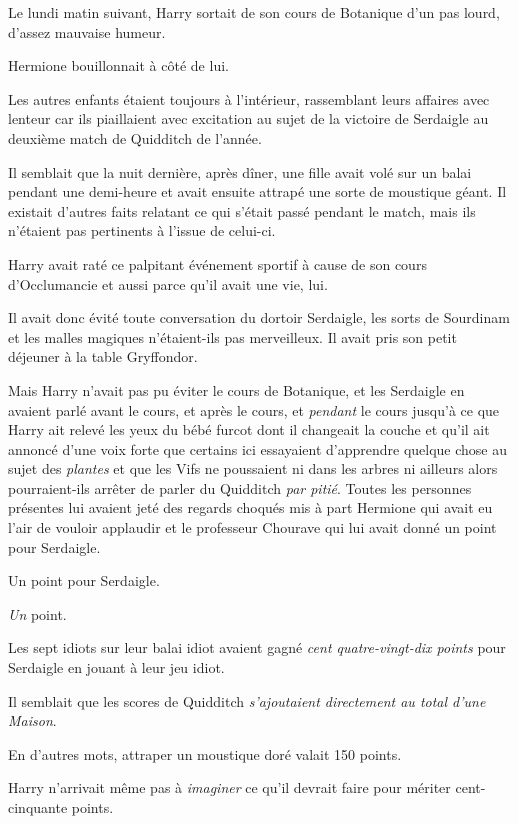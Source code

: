 \later

Le lundi matin suivant, Harry sortait de son cours de Botanique d'un pas lourd, d'assez mauvaise humeur.

Hermione bouillonnait à côté de lui.

Les autres enfants étaient toujours à l'intérieur, rassemblant leurs affaires avec lenteur car ils piaillaient avec excitation au sujet de la victoire de Serdaigle au deuxième match de Quidditch de l'année.

Il semblait que la nuit dernière, après dîner, une fille avait volé sur un balai pendant une demi-heure et avait ensuite attrapé une sorte de moustique géant.
Il existait d'autres faits relatant ce qui s'était passé pendant le match, mais ils n'étaient pas pertinents à l'issue de celui-ci.

Harry avait raté ce palpitant événement sportif à cause de son cours d'Occlumancie et aussi parce qu'il avait une vie, lui.

Il avait donc évité toute conversation du dortoir Serdaigle, les sorts de Sourdinam et les malles magiques n'étaient-ils pas merveilleux.
Il avait pris son petit déjeuner à la table Gryffondor.

Mais Harry n'avait pas pu éviter le cours de Botanique, et les Serdaigle en avaient parlé avant le cours, et après le cours, et \emph{pendant} le cours jusqu'à ce que Harry ait relevé les yeux du bébé furcot dont il changeait la couche et qu'il ait annoncé d'une voix forte que certains ici essayaient d'apprendre quelque chose au sujet des \emph{plantes} et que les Vifs ne poussaient ni dans les arbres ni ailleurs alors pourraient-ils arrêter de parler du Quidditch \emph{par pitié}.
Toutes les personnes présentes lui avaient jeté des regards choqués mis à part Hermione qui avait eu l'air de vouloir applaudir et le professeur Chourave qui lui avait donné un point pour Serdaigle.

Un point pour Serdaigle.

\emph{Un} point.

Les sept idiots sur leur balai idiot avaient gagné \emph{cent quatre-vingt-dix points} pour Serdaigle en jouant à leur jeu idiot.

Il semblait que les scores de Quidditch \emph{s'ajoutaient directement au total d'une Maison}.

En d'autres mots, attraper un moustique doré valait 150 points.

Harry n'arrivait même pas à \emph{imaginer} ce qu'il devrait faire pour mériter cent-cinquante points.

